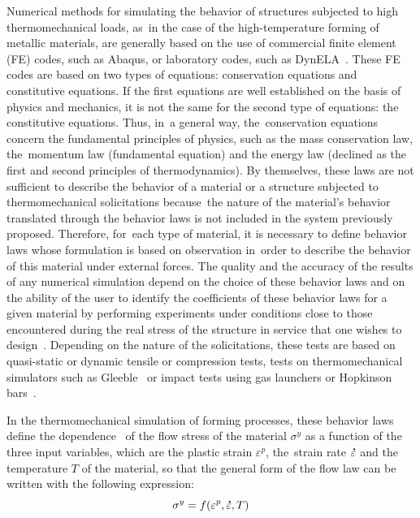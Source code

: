 \documentclass[algorithms,article,accept,pdftex,moreauthors]{Definitions/mdpi}
\DeclareRobustCommand{\mdot}[1]{\accentset{\mbox{\bfseries .}}{#1}}
\begin{document}
Numerical methods for simulating the behavior of structures subjected to high thermomechanical loads, as~in the case of the high-temperature forming of metallic materials, are generally based on the use of commercial finite element (FE) codes, such as Abaqus, or laboratory codes, such as DynELA~\cite{Pantale-2004}.
These FE codes are based on two types of equations: conservation equations and constitutive equations.
If the first equations are well established on the basis of physics and mechanics, it is not the same for the second type of equations: the constitutive equations.
Thus, in~a general way, the~conservation equations concern the fundamental principles of physics, such as the mass conservation law, the~momentum law (fundamental equation) and the energy law (declined as the first and second principles of thermodynamics).
By themselves, these laws are not sufficient to describe the behavior of a material or a structure subjected to thermomechanical solicitations because~the nature of the material’s behavior translated through the behavior laws is not included in the system previously proposed.
Therefore, for~each type of material, it is necessary to define behavior laws whose formulation is based on observation in~order to describe the behavior of this material under external forces.
The quality and the accuracy of the results of any numerical simulation depend on the choice of these behavior laws and on the ability of the user to identify the coefficients of these behavior laws for a given material by performing experiments under conditions close to those encountered during the real stress of the structure in service that one wishes to design~\cite{Dey-2007}.
Depending on the nature of the solicitations, these tests are based on quasi-static or dynamic tensile or compression tests, tests on thermomechanical simulators such as Gleeble~\cite{Lin-2009} or impact tests using gas launchers or Hopkinson bars~\cite{Kolsky-1949}.

In the thermomechanical simulation of forming processes, these behavior laws define the dependence~\cite{Lee-2006} of the flow stress of the material $\sigma^y$ as a function of the three input variables, which are the plastic strain $\varepsilon^p$, the~strain rate $\mdot\varepsilon$ and the temperature $T$ of the material, so that the general form of the flow law can be written with the following expression:
\begin{equation}
\sigma^y = f\left(\varepsilon^p,\mdot\varepsilon,T\right)\label{eq:GenFlow}
\end{equation}
\end{document}
